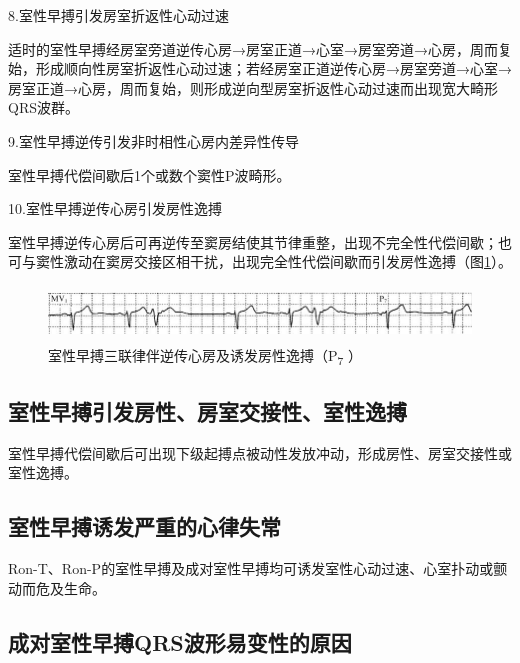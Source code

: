 8.室性早搏引发房室折返性心动过速

适时的室性早搏经房室旁道逆传心房→房室正道→心室→房室旁道→心房，周而复始，形成顺向性房室折返性心动过速；若经房室正道逆传心房→房室旁道→心室→房室正道→心房，周而复始，则形成逆向型房室折返性心动过速而出现宽大畸形QRS波群。

9.室性早搏逆传引发非时相性心房内差异性传导

室性早搏代偿间歇后1个或数个窦性P波畸形。

10.室性早搏逆传心房引发房性逸搏

室性早搏逆传心房后可再逆传至窦房结使其节律重整，出现不完全性代偿间歇；也可与窦性激动在窦房交接区相干扰，出现完全性代偿间歇而引发房性逸搏（图\ref{fig11-29}）。

\begin{figure}[!htbp]
 \centering
 \includegraphics[width=5.78125in,height=0.57292in]{./images/Image00189.jpg}
 \captionsetup{justification=centering}
 \caption{室性早搏三联律伴逆传心房及诱发房性逸搏（P\textsubscript{7} ）}
 \label{fig11-29}
  \end{figure} 

\protect\hypertarget{text00018.htmlux5cux23subid156}{}{}

\subsection{室性早搏引发房性、房室交接性、室性逸搏}

室性早搏代偿间歇后可出现下级起搏点被动性发放冲动，形成房性、房室交接性或室性逸搏。

\protect\hypertarget{text00018.htmlux5cux23subid157}{}{}

\subsection{室性早搏诱发严重的心律失常}

Ron-T、Ron-P的室性早搏及成对室性早搏均可诱发室性心动过速、心室扑动或颤动而危及生命。

\protect\hypertarget{text00018.htmlux5cux23subid158}{}{}

\subsection{成对室性早搏QRS波形易变性的原因}

